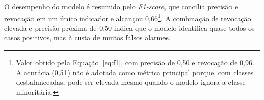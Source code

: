 O desempenho do modelo é resumido pelo \textit{F1-score}, que concilia precisão e revocação em um único indicador e alcançou 0,66\footnote{Valor obtido pela Equação~\eqref{eq:f1}, com precisão de 0,50 e revocação de 0,96. A acurácia (0,51) não é adotada como métrica principal porque, com classes desbalanceadas, pode ser elevada mesmo quando o modelo ignora a classe minoritária.}. A combinação de revocação elevada e precisão próxima de 0,50 indica que o modelo identifica quase todos os casos positivos, mas à custa de muitos falsos alarmes.